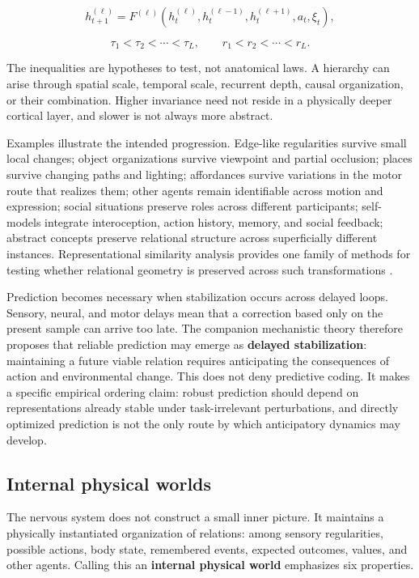 \documentclass[
  11pt,
  a4paper,
]{article}
\begin{document}
\[
h_{t+1}^{(\ell)} = F^{(\ell)}\!\left(h_t^{(\ell)},h_t^{(\ell-1)},h_t^{(\ell+1)},a_t,\xi_t\right),
\]

\[
\tau_1 < \tau_2 < \cdots < \tau_L,
\qquad
r_1 < r_2 < \cdots < r_L.
\]

The inequalities are hypotheses to test, not anatomical laws. A
hierarchy can arise through spatial scale, temporal scale, recurrent
depth, causal organization, or their combination. Higher invariance need
not reside in a physically deeper cortical layer, and slower is not
always more abstract.

Examples illustrate the intended progression. Edge-like regularities
survive small local changes; object organizations survive viewpoint and
partial occlusion; places survive changing paths and lighting;
affordances survive variations in the motor route that realizes them;
other agents remain identifiable across motion and expression; social
situations preserve roles across different participants; self-models
integrate interoception, action history, memory, and social feedback;
abstract concepts preserve relational structure across superficially
different instances. Representational similarity analysis provides one
family of methods for testing whether relational geometry is preserved
across such transformations \citep{nili2014}.

Prediction becomes necessary when stabilization occurs across delayed
loops. Sensory, neural, and motor delays mean that a correction based
only on the present sample can arrive too late. The companion
mechanistic theory therefore proposes that reliable prediction may
emerge as \textbf{delayed stabilization}: maintaining a future viable
relation requires anticipating the consequences of action and
environmental change. This does not deny predictive coding. It makes a
specific empirical ordering claim: robust prediction should depend on
representations already stable under task-irrelevant perturbations, and
directly optimized prediction is not the only route by which
anticipatory dynamics may develop.

\subsection{Internal physical worlds}\label{internal-physical-worlds}

The nervous system does not construct a small inner picture. It
maintains a physically instantiated organization of relations: among
sensory regularities, possible actions, body state, remembered events,
expected outcomes, values, and other agents. Calling this an
\textbf{internal physical world} emphasizes six properties.
\end{document}
